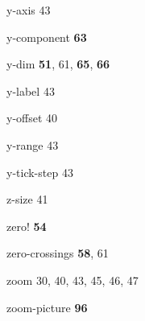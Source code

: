 \begin{theindex}
\item y-axis 43
\item y-component {\bf 63}
\item y-dim {\bf 51}, 61, {\bf 65}, {\bf 66}
\item y-label 43
\item y-offset 40
\item y-range 43
\item y-tick-step 43
\item z-size 41
\item zero! {\bf 54}
\item zero-crossings {\bf 58}, 61
\item zoom 30, 40, 43, 45, 46, 47
\item zoom-picture {\bf 96}
\end{theindex}
